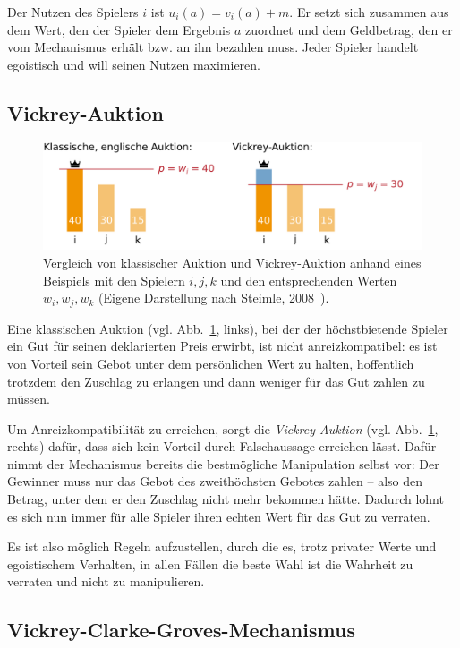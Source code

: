 \documentclass[a4paper,11pt]{article}
\theoremstyle{definition}
\theoremstyle{plain}
\theoremstyle{definition}
\begin{document}
Der Nutzen des Spielers $i$ ist $u_i(a) = v_i(a) + m$. Er setzt sich zusammen aus dem Wert, den der Spieler dem Ergebnis $a$ zuordnet und dem Geldbetrag, den er vom Mechanismus erhält bzw. an ihn bezahlen muss. Jeder Spieler handelt egoistisch und will seinen Nutzen maximieren.

\subsection{Vickrey-Auktion}
\begin{figure}
	\centering
	\includegraphics[width=\textwidth]{img/vickrey-auktion.pdf}
	\caption{Vergleich von klassischer Auktion und Vickrey-Auktion anhand eines Beispiels mit den Spielern $i,j,k$ und den entsprechenden Werten $w_i,w_j,w_k$ (Eigene Darstellung nach Steimle, 2008~\cite{ste08}).}
	\label{fig:vickAukt}
\end{figure}

Eine klassischen Auktion (vgl. Abb.~\ref{fig:vickAukt}, links), bei der der höchstbietende Spieler ein Gut für seinen deklarierten Preis erwirbt, ist nicht anreizkompatibel: es ist von Vorteil sein Gebot unter dem persönlichen Wert zu halten, hoffentlich trotzdem den Zuschlag zu erlangen und dann weniger für das Gut zahlen zu müssen.

Um Anreizkompatibilität zu erreichen, sorgt die \emph{Vickrey-Auktion} (vgl. Abb.~\ref{fig:vickAukt}, rechts) dafür, dass sich kein Vorteil durch Falschaussage erreichen lässt. Dafür nimmt der Mechanismus bereits die bestmögliche Manipulation selbst vor: Der Gewinner muss nur das Gebot des zweithöchsten Gebotes zahlen -- also den Betrag, unter dem er den Zuschlag nicht mehr bekommen hätte. Dadurch lohnt es sich nun immer für alle Spieler ihren echten Wert für das Gut zu verraten.

Es ist also möglich Regeln aufzustellen, durch die es, trotz privater Werte und egoistischem Verhalten, in allen Fällen die beste Wahl ist die Wahrheit zu verraten und nicht zu manipulieren.

\subsection{Vickrey-Clarke-Groves-Mechanismus}
\end{document}
